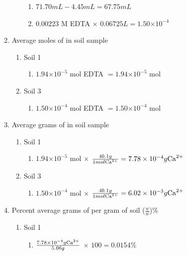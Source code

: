 \documentclass[10pt]{article}
\providecommand{\e}[1]{\ensuremath{\times 10^{#1}}}
\begin{document}
\begin{enumerate}
\begin{enumerate}
\begin{enumerate}
\begin{enumerate}
                 \item $71.70 mL - 4.45 mL = 67.75 mL$
                 \item $0.00223$ M EDTA $\times$ $ 0.06725L = 1.50\e{-4}$
            \end{enumerate}
        \end{enumerate}
        \item Average moles of  in soil sample
        \begin{enumerate}
            \item Soil 1
            \begin{enumerate}
                \item $1.94\e{-5}$ mol EDTA $= 1.94\e{-5}$ mol 
            \end{enumerate}
            \item Soil 3
            \begin{enumerate}
                \item $1.50\e{-4}$ mol EDTA $= 1.50\e{-4}$ mol 
            \end{enumerate}
        \end{enumerate}
        \item Average grams of  in soil sample
        \begin{enumerate}
            \item Soil 1
            \begin{enumerate}
                \item $1.94\e{-5}$ mol  $\times$ $ \frac{40.1g}{1 mol \ce{Ca^2+}} = 7.78\e{-4}g\ce{Ca^2+}$
            \end{enumerate}
            \item Soil 3
            \begin{enumerate}
                \item $1.50\e{-4}$ mol  $\times$ $ \frac{40.1g}{1 mol \ce{Ca^2+}} = 6.02\e{-3}g\ce{Ca^2+}$
            \end{enumerate}
        \end{enumerate}
        \item Percent average grams of  per gram of soil ($\frac{w}{w}$)$\%$
        \begin{enumerate}
            \item Soil 1
            \begin{enumerate}
                \item $\frac{7.78\e{-4}g\ce{Ca^2+}}{5.06g}$ $\times$ $ 100 = 0.0154\%$
            \end{enumerate}

\end{enumerate}
\end{enumerate}
\end{enumerate}
\end{document}
